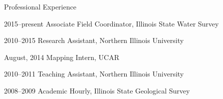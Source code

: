 \begin{cvlist}{Professional Experience}

        \item[2015--present] Associate Field Coordinator, Illinois State Water Survey
        \item[2010--2015] Research Assistant, Northern Illinois University
        \item[August, 2014] Mapping Intern, UCAR
        \item[2010--2011] Teaching Assistant, Northern Illinois University
        \item[2008--2009] Academic Hourly, Illinois State Geological Survey

\end{cvlist}
